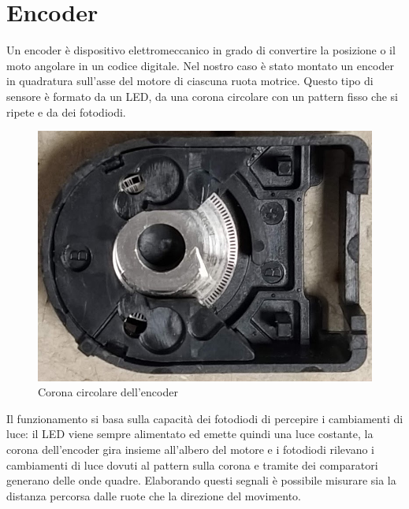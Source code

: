 \section{Encoder}
Un encoder è dispositivo elettromeccanico in grado di convertire la posizione o il moto angolare in un codice digitale.
Nel nostro caso è stato montato un encoder in quadratura sull'asse del motore di ciascuna ruota motrice.
Questo tipo di sensore è formato da un LED, da una corona circolare con un pattern fisso che si ripete e da dei fotodiodi. \\

\begin{figure}[H]
\centering
\includegraphics[scale=0.30]{images/corona.png}
\caption{Corona circolare dell'encoder}
\end{figure}

Il funzionamento si basa sulla capacità dei fotodiodi di percepire i cambiamenti di luce: il LED viene sempre alimentato ed emette quindi una luce costante, la corona dell'encoder gira insieme all'albero del motore e i fotodiodi rilevano i cambiamenti di luce dovuti al pattern sulla corona e tramite dei comparatori generano delle onde quadre.
Elaborando questi segnali è possibile misurare sia la distanza percorsa dalle ruote che la direzione del movimento.

